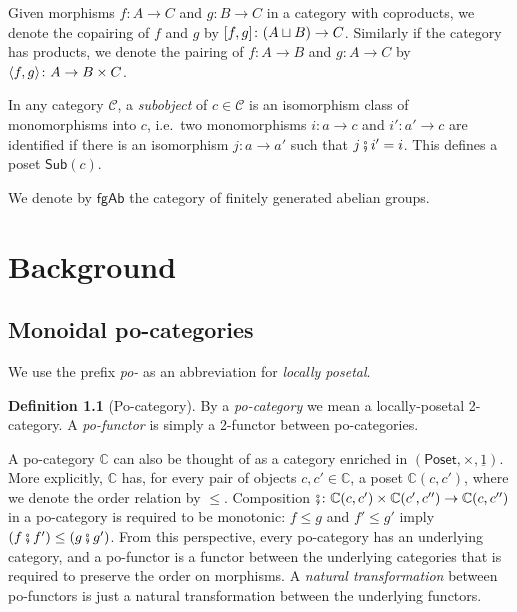 \documentclass[11pt, oneside, article]{memoir}
\theoremstyle{plain}
\theoremstyle{definition}
\newtheorem{definition}[theorem]{Definition}
\theoremstyle{remark}
\newcommand{\ord}[1]{\underline{#1}}%
\newcommand{\cat}[1]{\mathcal{#1}}%
\newcommand{\Cat}[1]{{\mathsf{#1}}}%
\newcommand{\Funr}[1]{\mathsf{#1}}%
\DeclarePairedDelimiter{\pair}{\langle}{\rangle}
\DeclarePairedDelimiter{\copair}{[}{]}
\newcommand{\cc}{\mathbb{C}}
\newcommand{\fgab}{\Cat{fgAb}}
\newcommand{\sub}{\Funr{Sub}}
\newcommand{\cp}{\mathbin{\fatsemi}}
\newcommand{\poset}{\Cat{Poset}}
\begin{document}
Given morphisms $f\colon A\to C$ and $g\colon B\to C$ in a category with coproducts, we denote the copairing of $f$ and $g$ by $\copair{f,g}\colon(A\sqcup B)\to C$. Similarly if the category has products, we denote the pairing of $f\colon A\to B$ and $g\colon A\to C$ by $\pair{f,g}\colon A\to B\times C$.

In any category $\cat{C}$, a \emph{subobject} of $c\in\cat{C}$ is an isomorphism class of monomorphisms into $c$, i.e.\ two monomorphisms $i\colon a\to c$ and $i'\colon a'\to c$ are identified if there is an isomorphism $j\colon a\to a'$ such that $j\cp i'=i$. This defines a poset $\sub(c)$.

We denote by $\fgab$ the category of finitely generated abelian groups.

\chapter{Background}

\section{Monoidal po-categories}

We use the prefix \emph{po-} as an abbreviation for \emph{locally posetal}.

\begin{definition}[Po-category]
By a \emph{po-category} we mean a locally-posetal 2-category. A \emph{po-functor} is simply a 2-functor between po-categories.
\end{definition}
A po-category $\cc$ can also be thought of as a category enriched in $(\poset,\times,\ord{1})$. More explicitly, $\cc$ has, for every pair of objects $c,c'\in\cc$, a poset $\cc(c,c')$, where we denote the order relation by $\leq$. Composition $\cp\colon\cc(c,c')\times \cc(c',c'')\to\cc(c,c'')$ in a po-category is required to be monotonic: $f\leq g$ and $f'\leq g'$ imply $(f\cp f')\leq(g\cp g')$. From this perspective, every po-category has an underlying category, and a po-functor is a functor between the underlying categories that is required to preserve the order on morphisms. A \emph{natural transformation} between po-functors is just a natural transformation between the underlying functors.
\end{document}

